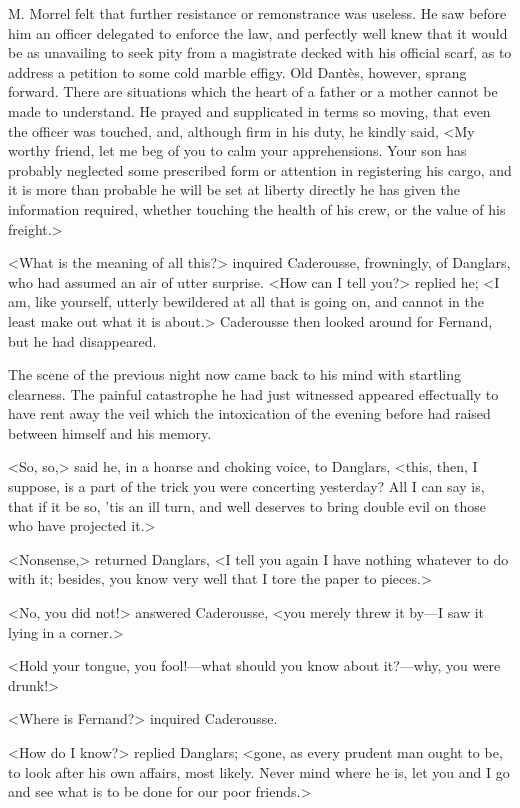  M. Morrel felt that further resistance or remonstrance was useless. He saw before him an officer delegated to enforce the law, and perfectly well knew that it would be as unavailing to seek pity from a magistrate decked with his official scarf, as to address a petition to some cold marble effigy. Old Dantès, however, sprang forward. There are situations which the heart of a father or a mother cannot be made to understand. He prayed and supplicated in terms so moving, that even the officer was touched, and, although firm in his duty, he kindly said, <My worthy friend, let me beg of you to calm your apprehensions. Your son has probably neglected some prescribed form or attention in registering his cargo, and it is more than probable he will be set at liberty directly he has given the information required, whether touching the health of his crew, or the value of his freight.> 

 <What is the meaning of all this?> inquired Caderousse, frowningly, of Danglars, who had assumed an air of utter surprise.  <How can I tell you?> replied he; <I am, like yourself, utterly bewildered at all that is going on, and cannot in the least make out what it is about.> Caderousse then looked around for Fernand, but he had disappeared. 

 The scene of the previous night now came back to his mind with startling clearness. The painful catastrophe he had just witnessed appeared effectually to have rent away the veil which the intoxication of the evening before had raised between himself and his memory. 

 <So, so,> said he, in a hoarse and choking voice, to Danglars, <this, then, I suppose, is a part of the trick you were concerting yesterday? All I can say is, that if it be so, 'tis an ill turn, and well deserves to bring double evil on those who have projected it.> 

 <Nonsense,> returned Danglars, <I tell you again I have nothing whatever to do with it; besides, you know very well that I tore the paper to pieces.> 

 <No, you did not!> answered Caderousse, <you merely threw it by—I saw it lying in a corner.> 

 <Hold your tongue, you fool!—what should you know about it?—why, you were drunk!> 

 <Where is Fernand?> inquired Caderousse. 

 <How do I know?> replied Danglars; <gone, as every prudent man ought to be, to look after his own affairs, most likely. Never mind where he is, let you and I go and see what is to be done for our poor friends.> 

